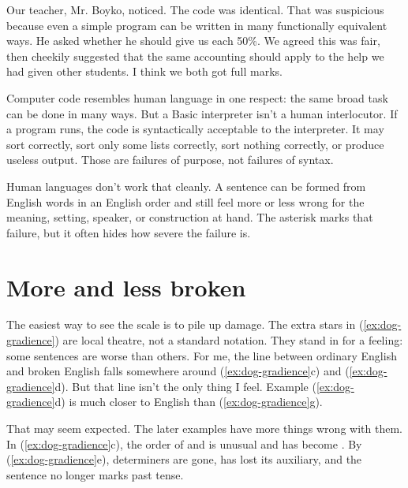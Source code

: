 Our teacher, Mr. Boyko, noticed. The code was identical. That was suspicious
because even a simple program can be written in many functionally equivalent
ways. He asked whether he should give us each 50\%. We agreed this was fair,
then cheekily suggested that the same accounting should apply to the help we
had given other students. I think we both got full marks.

Computer code resembles human language in one respect: the same broad task
can be done in many ways. But a Basic interpreter isn't a human interlocutor.
If a program runs, the code is syntactically acceptable to the interpreter. It
may sort correctly, sort only some lists correctly, sort nothing correctly, or
produce useless output. Those are failures of purpose, not failures of syntax.

Human languages don't work that cleanly. A sentence can be formed from
English words in an English order and still feel more or less wrong for the
meaning, setting, speaker, or construction at hand. The asterisk marks that
failure, but it often hides how severe the failure is.

\section{More and less broken}

The easiest way to see the scale is to pile up damage. The extra stars in
(\ref{ex:dog-gradience}) are local theatre, not a standard notation. They
stand in for a feeling: some sentences are worse than others.
\ea \label{ex:dog-gradience}
 \z
\z
For me, the line between ordinary English and broken English falls somewhere
around (\ref{ex:dog-gradience}c) and (\ref{ex:dog-gradience}d). But that
line isn't the only thing I feel. Example (\ref{ex:dog-gradience}d) is much
closer to English than (\ref{ex:dog-gradience}g).

That may seem expected. The later examples have more things wrong with
them. In (\ref{ex:dog-gradience}c), the order of  and
 is unusual and  has become .
By (\ref{ex:dog-gradience}e), determiners are gone,  has lost
its auxiliary, and the sentence no longer marks past tense.

